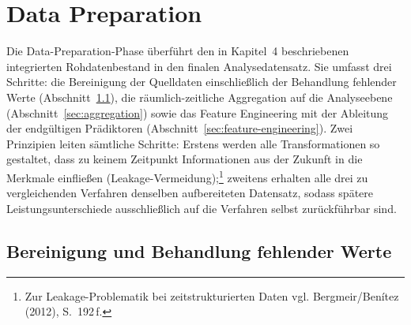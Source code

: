 %
%
%

\section{Data Preparation}
\label{sec:data-preparation}

Die Data-Preparation-Phase überführt den in Kapitel~4 beschriebenen
integrierten Rohdatenbestand in den finalen Analysedatensatz. Sie umfasst
drei Schritte: die Bereinigung der Quelldaten einschließlich der Behandlung
fehlender Werte (Abschnitt~\ref{sec:bereinigung}), die räumlich-zeitliche
Aggregation auf die Analyseebene (Abschnitt~\ref{sec:aggregation}) sowie das
Feature Engineering mit der Ableitung der endgültigen Prädiktoren
(Abschnitt~\ref{sec:feature-engineering}). Zwei Prinzipien leiten sämtliche
Schritte: Erstens werden alle Transformationen so gestaltet, dass zu keinem
Zeitpunkt Informationen aus der Zukunft in die Merkmale einfließen
(Leakage-Vermeidung);\footnote{Zur Leakage-Problematik bei zeitstrukturierten
Daten vgl. Bergmeir/Benítez (2012), S.~192\,f.} zweitens erhalten alle drei
zu vergleichenden Verfahren denselben aufbereiteten Datensatz, sodass
spätere Leistungsunterschiede ausschließlich auf die Verfahren selbst
zurückführbar sind.

\subsection{Bereinigung und Behandlung fehlender Werte}
\label{sec:bereinigung}

